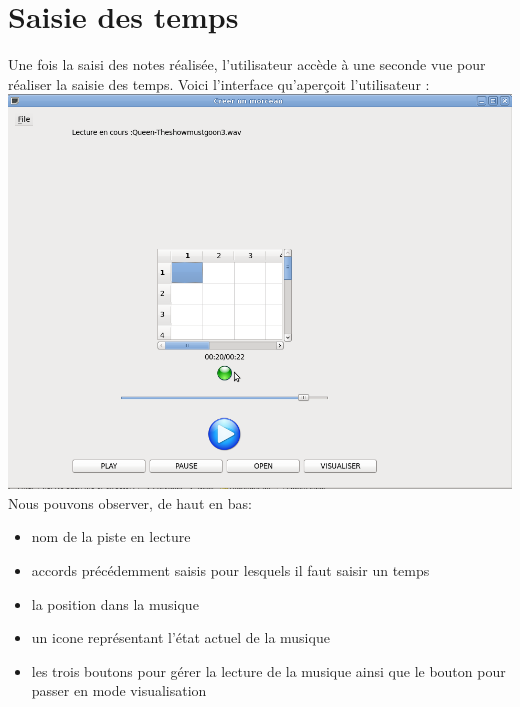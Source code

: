 \section{Saisie des temps}
Une fois la saisi des notes réalisée, l'utilisateur accède à une seconde vue pour réaliser la saisie des temps. Voici l'interface qu'aperçoit l'utilisateur :
\includegraphics{editeur.png}
Nous pouvons observer, de haut en bas:
\begin{itemize}
\item nom de la piste en lecture
\item accords précédemment saisis pour lesquels il faut saisir un temps
\item la position dans la musique
\item un icone représentant l'état actuel de la musique
\item les trois boutons pour gérer la lecture de la musique ainsi que le bouton pour passer en mode visualisation
\end{itemize}
